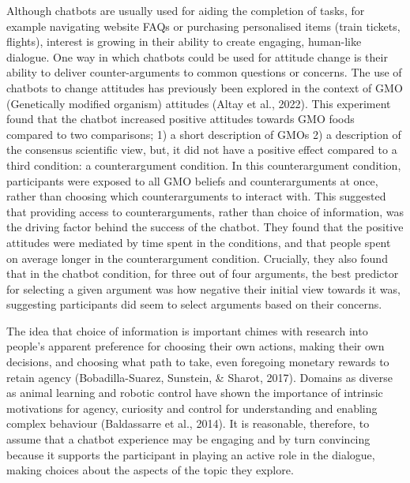 \documentclass[
  english,
  ,jou,floatsintext]{apa6}
\begin{document}
Although chatbots are usually used for aiding the completion of tasks, for example navigating website FAQs or purchasing personalised items (train tickets, flights), interest is growing in their ability to create engaging, human-like dialogue. One way in which chatbots could be used for attitude change is their ability to deliver counter-arguments to common questions or concerns. The use of chatbots to change attitudes has previously been explored in the context of GMO (Genetically modified organism) attitudes (Altay et al., 2022). This experiment found that the chatbot increased positive attitudes towards GMO foods compared to two comparisons; 1) a short description of GMOs 2) a description of the consensus scientific view, but, it did not have a positive effect compared to a third condition: a counterargument condition. In this counterargument condition, participants were exposed to all GMO beliefs and counterarguments at once, rather than choosing which counterarguments to interact with. This suggested that providing access to counterarguments, rather than choice of information, was the driving factor behind the success of the chatbot. They found that the positive attitudes were mediated by time spent in the conditions, and that people spent on average longer in the counterargument condition. Crucially, they also found that in the chatbot condition, for three out of four arguments, the best predictor for selecting a given argument was how negative their initial view towards it was, suggesting participants did seem to select arguments based on their concerns.

The idea that choice of information is important chimes with research into people's apparent preference for choosing their own actions, making their own decisions, and choosing what path to take, even foregoing monetary rewards to retain agency (Bobadilla-Suarez, Sunstein, \& Sharot, 2017). Domains as diverse as animal learning and robotic control have shown the importance of intrinsic motivations for agency, curiosity and control for understanding and enabling complex behaviour (Baldassarre et al., 2014). It is reasonable, therefore, to assume that a chatbot experience may be engaging and by turn convincing because it supports the participant in playing an active role in the dialogue, making choices about the aspects of the topic they explore.
\end{document}
